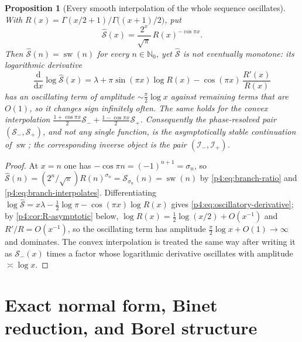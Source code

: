 \documentclass[11pt,a4paper,oneside]{book}
\theoremstyle{plain}
\newtheorem{proposition}[theorem]{Proposition}
\theoremstyle{definition}
\theoremstyle{remark}
\newcommand{\Nat}{\mathbb{N}}
\newcommand{\dd}{\mathrm{d}}
\begin{document}
\begin{proposition}[Every smooth interpolation of the whole sequence oscillates]
\label{p4:prop:oscillatory}
With $R(x)=\Gamma(x/2+1)/\Gamma\bigl((x+1)/2\bigr)$, put
\begin{equation}
  \widehat{\mathcal S}(x)=\frac{2^{x}}{\sqrt\pi}\,R(x)^{-\cos\pi x} .
  \label{p4:eq:oscillatory-interps}
\end{equation}
Then $\widehat{\mathcal S}(n)=\operatorname{sw}(n)$ for every $n\in\Nat_0$,
yet $\widehat{\mathcal S}$ is not eventually monotone: its logarithmic
derivative
\begin{equation}
  \frac{\dd}{\dd x}\log\widehat{\mathcal S}(x)
  =\lambda+\pi\sin(\pi x)\log R(x)-\cos(\pi x)\,\frac{R'(x)}{R(x)}
  \label{p4:eq:oscillatory-derivative}
\end{equation}
has an oscillating term of amplitude $\sim\tfrac\pi2\log x$ against remaining
terms that are $O(1)$, so it changes sign infinitely often.  The same holds
for the convex interpolation
$\tfrac{1+\cos\pi x}2\mathcal S_-+\tfrac{1-\cos\pi x}2\mathcal S_+$.
Consequently the phase-resolved \emph{pair} $(\mathcal S_-,\mathcal S_+)$, and
not any single function, is the asymptotically stable continuation of
$\operatorname{sw}$; the corresponding inverse object is the pair
$(\mathcal I_-,\mathcal I_+)$.
\end{proposition}

\begin{proof}
At $x=n$ one has $-\cos\pi n=(-1)^{n+1}=\sigma_n$, so
$\widehat{\mathcal S}(n)=(2^{n}/\sqrt\pi)R(n)^{\sigma_n}
=\mathcal S_{\sigma_n}(n)=\operatorname{sw}(n)$ by
\cref{p4:eq:branch-ratio} and \cref{p4:eq:branch-interpolates}.
Differentiating
$\log\widehat{\mathcal S}=x\lambda-\tfrac12\log\pi-\cos(\pi x)\log R(x)$ gives
\cref{p4:eq:oscillatory-derivative}; by \cref{p4:cor:R-asymptotic} below,
$\log R(x)=\tfrac12\log(x/2)+O(x^{-1})$ and $R'/R=O(x^{-1})$, so the
oscillating term has amplitude $\tfrac\pi2\log x+O(1)\to\infty$ and dominates.
The convex interpolation is treated the same way after writing it as
$\mathcal S_-(x)$ times a factor whose logarithmic derivative oscillates with
amplitude $\asymp\log x$.
\end{proof}

\section{Exact normal form, Binet reduction, and Borel structure}
\label{p4:sec:normalform}
\end{document}
